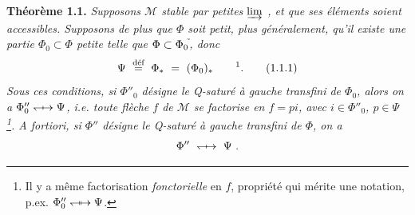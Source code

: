 \textbf{Théorème 1.1.} \textit{Supposons $\mathcal{M}$ stable par petites $\varinjlim$ , et que ses éléments soient accessibles. Supposons de plus que $\Phi$ soit petit, plus généralement, qu'il existe une partie $\Phi_0 \subset \Phi$ petite telle que $\Phi \subset \Phi_0{}^{\tilde{}}$, donc}
\[
\Psi \ \overset{\text{déf}}{=} \ \Phi_{*} \ = \ (\Phi_0)_{*} \qquad \text{\footnotemark}.
\tag*{(1.1.1)} %
\]
\textit{Sous ces conditions, si $\Phi''_0$ désigne le \textup{Q}-saturé à gauche transfini de $\Phi_0$, alors on a $\Phi''_0 \Qx{\leftharpoondown}{\rightarrow} \Psi$, i.e. toute flèche $f$ de $\mathcal{M}$ se factorise en $f = pi$, avec $i \in \Phi''_0$, $p \in \Psi$\,\footnote{Il y a même factorisation \textit{fonctorielle} en $f$, propriété qui mérite une notation, p.ex. $\Phi''_0 \Qxx{\leftharpoondown}{\rightarrow} \Psi$.}. A fortiori, si $\Phi''$ désigne le \textup{Q}-saturé à gauche transfini de $\Phi$, on a} %
\[
\Phi'' \ \Qx{\leftharpoondown}{\rightarrow} \ \Psi\ .
\]

